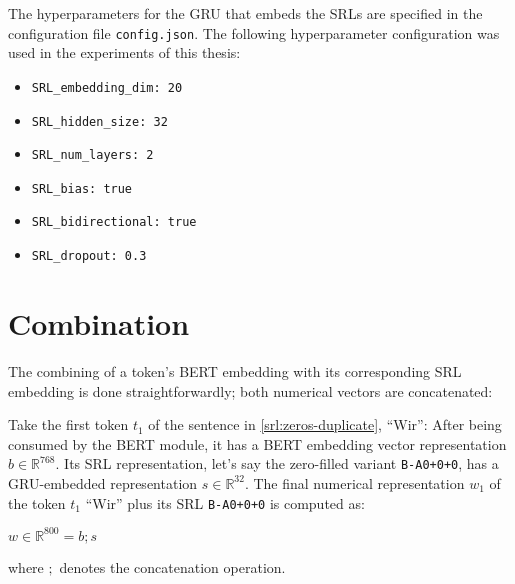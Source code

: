 \begin{tcolorbox}[
  colback=blue!5!white,
  colframe=blue!75!black,
  title={\centering Code}]

  The hyperparameters for the GRU that embeds the SRLs are specified in the configuration file
  \texttt{config.json}. The following hyperparameter configuration was used in the experiments
  of this thesis:

  \begin{itemize}
    \itemsep0em
	  \item[] \texttt{SRL\_embedding\_dim: 20}
	  \item[] \texttt{SRL\_hidden\_size: 32}
	  \item[] \texttt{SRL\_num\_layers: 2}
	  \item[] \texttt{SRL\_bias: true}
	  \item[] \texttt{SRL\_bidirectional: true}
	  \item[] \texttt{SRL\_dropout: 0.3}
  \end{itemize}

\end{tcolorbox}



\section{Combination}

The combining of a token's BERT embedding with its corresponding SRL embedding is done
straightforwardly; both numerical vectors are concatenated:

Take the first token $t_1$ of the sentence in \ref{srl:zeros-duplicate},
``Wir'': After being consumed by the BERT module, it has a BERT embedding
vector representation $b \in \mathbb{R}^{768}$. Its SRL representation,
let's say the zero-filled variant \texttt{B-A0+0+0}, has a GRU-embedded
representation $s \in \mathbb{R}^{32}$. The final numerical representation
$w_1$ of the token $t_1$ ``Wir'' plus its SRL \texttt{B-A0+0+0} is computed
as:

$w \in \mathbb{R}^{800} = b ; s$

where $;$ denotes the concatenation operation.

